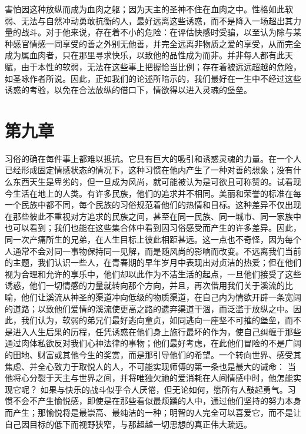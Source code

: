 害怕因这种放纵而成为血肉之躯；因为天主的圣神不住在血肉之中。性格如此软弱、无法与自然冲动勇敢抗衡的人，最好远离这些诱惑，而不是降入一场超出其力量的战斗。对于他来说，存在着不小的危险：在评估快感时受骗，以至认为除与某种感官情感一同享受的善之外别无他善，并完全远离非物质之爱的享受，从而完全成为属血肉者，只在那里寻求快乐，以致他的品性成为而非。并非每人都有此天赋，由于本性的软弱，无法在这些事上把握恰当比例；存在着被远远超越的危险，如圣咏作者所说。因此，正如我们的论述所暗示的，我们最好在一生中不经过这些诱惑的考验，以免在合法放纵的借口下，情欲得以进入灵魂的堡垒。\par


\section{第九章}

习俗的确在每件事上都难以抵抗。它具有巨大的吸引和诱惑灵魂的力量。在一个人已经形成固定情感状态的情况下，这种习惯在他内产生了一种对善的想象；没有什么东西天生是卑劣的，但一旦成为风尚，就可能被认为是可欲且可称赞的。试看现今生活在地上的人类。有许多民族，他们的追求并不相同。美丽和荣誉的标准在每一个民族中都不同，每个民族的习俗规范着他们的热情和目标。这种差异不仅出现在那些彼此不重视对方追求的民族之间，甚至在同一民族、同一城市、同一家族中也可以看到；我们也能在这些集合体中看到因习俗感受而产生的许多差异。因此，同一次产痛所生的兄弟，在人生目标上彼此相距甚远。这一点也不奇怪，因为每个人通常不会对同一事物保持同一见解，而是随风尚的影响而改变。不远离我们当前的主题，我们认识一些人，在青春期的早年岁月中表现出对贞洁的热爱；但在他们视为合理和允许的享乐中，他们却以此作为不洁生活的起点，一旦他们接受了这些诱惑，他们一切情感的力量就转向那个方向，并且，再次借用我们关于溪流的比喻，他们让溪流从神圣的渠道冲向低级的物质渠道，在自己内为情欲开辟一条宽阔的道路；以致他们爱情的溪流使更高之路的遗弃渠道干涸，而泛滥于放纵之中。因此，我们认为，软弱的弟兄们最好逃向童贞，如同逃向一座坚不可摧的堡垒，而不是进入人生后果的历程，任凭诱惑在他们身上施行最坏的作为，使自己纠缠于那些通过肉体私欲反对我们心神法律的事物；他们最好考虑，在此他们冒险的不是广阔的田地、财富或其他今生的奖赏，而是那引导他们的希望。一个转向世界、感受其焦虑、并全心致力于取悦人的人，不可能实现师傅的第一条也是最大的诫命： 当他将心分裂于天主与世界之间，并将唯独欠祂的爱消耗在人间情感中时，他怎能实现它呢？ 如果与快乐的战斗似乎令人厌倦，但无论如何，愿所有人鼓起勇气。习惯不会不产生愉悦感，即使是在那些看似最烦躁的人中，通过他们坚持的努力本身而产生；那愉悦将是最崇高、最纯洁的一种；明智的人完全可以喜爱它，而不是让自己因目标的低下而视野狭窄，与那超越一切思想的真正伟大疏远。\par

